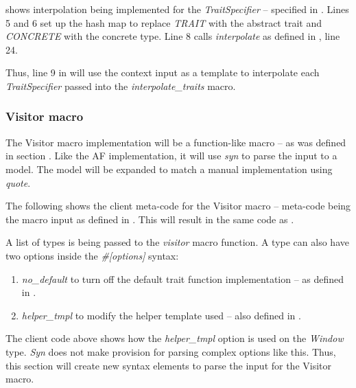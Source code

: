  shows interpolation being implemented for the \textit{TraitSpecifier} -- specified in .
Lines 5 and 6 set up the hash map to replace \textit{TRAIT} with the abstract trait and \textit{CONCRETE} with the concrete type.
Line 8 calls \textit{interpolate} as defined in , line 24.


Thus, line 9 in  will use the context input as a template to interpolate each \textit{TraitSpecifier} passed into the \textit{interpolate\_traits} macro.

\subsubsection{Visitor macro}
The Visitor macro implementation will be a function-like macro -- as was defined in section .
Like the AF implementation, it will use \textit{syn} to parse the input to a model.
The model will be expanded to match a manual implementation using \textit{quote}.

The following shows the client meta-code for the Visitor macro -- meta-code being the macro input as defined in .
This will result in the same code as .


A list of types is being passed to the \textit{visitor} macro function.
A type can also have two options inside the \textit{\#[options]} syntax:
\begin{enumerate}
	\item \textit{no\_default} to turn off the default trait function implementation -- as defined in .
	\item \textit{helper\_tmpl} to modify the helper template used -- also defined in .
\end{enumerate}

The client code above shows how the \textit{helper\_tmpl} option is used on the \textit{Window} type.
\textit{Syn} does not make provision for parsing complex options like this.
Thus, this section will create new syntax elements to parse the input for the Visitor macro.


